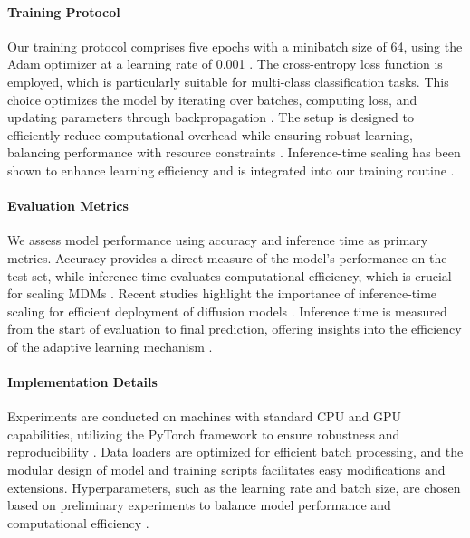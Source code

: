 \documentclass{article} %
\begin{document}
\paragraph{Training Protocol} 
Our training protocol comprises five epochs with a minibatch size of 64, using the Adam optimizer at a learning rate of 0.001 \citep{diffusion2025}. The cross-entropy loss function is employed, which is particularly suitable for multi-class classification tasks. This choice optimizes the model by iterating over batches, computing loss, and updating parameters through backpropagation \citep{highfield2019}. The setup is designed to efficiently reduce computational overhead while ensuring robust learning, balancing performance with resource constraints \citep{a2023,steering2024,mdta2g2024}. Inference-time scaling has been shown to enhance learning efficiency and is integrated into our training routine \citep{improving2025}.

\paragraph{Evaluation Metrics} 
We assess model performance using accuracy and inference time as primary metrics. Accuracy provides a direct measure of the model's performance on the test set, while inference time evaluates computational efficiency, which is crucial for scaling MDMs \citep{masked2024,scaling2024,path2025}. Recent studies highlight the importance of inference-time scaling for efficient deployment of diffusion models \citep{improving2025}. Inference time is measured from the start of evaluation to final prediction, offering insights into the efficiency of the adaptive learning mechanism \citep{spg2025,beyond2025}.

\paragraph{Implementation Details} 
Experiments are conducted on machines with standard CPU and GPU capabilities, utilizing the PyTorch framework to ensure robustness and reproducibility \citep{dice2024}. Data loaders are optimized for efficient batch processing, and the modular design of model and training scripts facilitates easy modifications and extensions. Hyperparameters, such as the learning rate and batch size, are chosen based on preliminary experiments to balance model performance and computational efficiency \citep{nomad2023,genmol2025,llcaps2023}.
\end{document}
